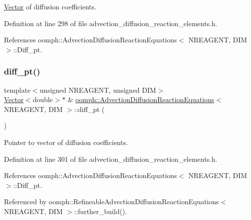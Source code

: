 \hyperlink{classoomph_1_1Vector}{Vector} of diffusion coefficients. 



Definition at line 298 of file advection\+\_\+diffusion\+\_\+reaction\+\_\+elements.\+h.



References oomph\+::\+Advection\+Diffusion\+Reaction\+Equations$<$ N\+R\+E\+A\+G\+E\+N\+T, D\+I\+M $>$\+::\+Diff\+\_\+pt.

\mbox{\label{classoomph_1_1AdvectionDiffusionReactionEquations_a70db4dae4524ac4c2d6af262c4e4d47e}} 
\subsubsection{\texorpdfstring{diff\+\_\+pt()}{diff\_pt()}}
{\footnotesize\ttfamily template$<$unsigned N\+R\+E\+A\+G\+E\+NT, unsigned D\+IM$>$ \\
\hyperlink{classoomph_1_1Vector}{Vector}$<$double$>$$\ast$ \& \hyperlink{classoomph_1_1AdvectionDiffusionReactionEquations}{oomph\+::\+Advection\+Diffusion\+Reaction\+Equations}$<$ N\+R\+E\+A\+G\+E\+NT, D\+IM $>$\+::diff\+\_\+pt (\begin{DoxyParamCaption}{ }\end{DoxyParamCaption})\hspace{0.3cm}{\ttfamily [inline]}}



Pointer to vector of diffusion coefficients. 



Definition at line 301 of file advection\+\_\+diffusion\+\_\+reaction\+\_\+elements.\+h.



References oomph\+::\+Advection\+Diffusion\+Reaction\+Equations$<$ N\+R\+E\+A\+G\+E\+N\+T, D\+I\+M $>$\+::\+Diff\+\_\+pt.



Referenced by oomph\+::\+Refineable\+Advection\+Diffusion\+Reaction\+Equations$<$ N\+R\+E\+A\+G\+E\+N\+T, D\+I\+M $>$\+::further\+\_\+build().

\mbox{\label{classoomph_1_1AdvectionDiffusionReactionEquations_abe712696eb8db1c8b4f2eb5103a54c3f}} 
